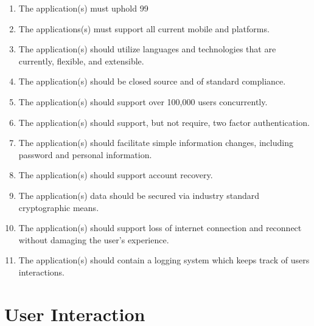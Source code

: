 \documentclass[11pt]{article}
\begin{document}
\begin{enumerate}
	\item The application(s) must uphold 99%
	\item The applications(s) must support all current mobile and platforms.
	\item The application(s) should utilize languages and technologies that are currently, flexible, and extensible.
	\item The application(s) should be closed source and of standard compliance.
	\item The application(s) should support over 100,000 users concurrently.
	\item The application(s) should support, but not require, two factor authentication.
	\item The application(s) should facilitate simple information changes, including password and personal information.
	\item The application(s) should support account recovery.
	\item The application(s) data should be secured via industry standard cryptographic means.
	\item The application(s) should support loss of internet connection and reconnect without damaging the user's experience.
	\item The application(s) should contain a logging system which keeps track of users interactions.
\end{enumerate}

%
\section{User Interaction}\label{user-interaction}
\end{document}
